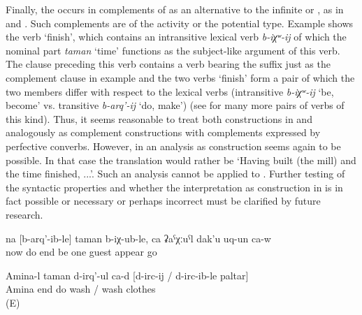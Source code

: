 Finally, the  occurs in complements of  as an alternative to the infinite or , as in  and . Such complements are of the activity or the potential type. Example  shows the verb `finish', which contains an intransitive lexical verb \textit{b-iχʷ-ij} of which the nominal part \textit{taman} `time' functions as the subject-like argument of this verb. The clause preceding this verb contains a verb bearing the  suffix just as the complement clause in example  and the two verbs `finish' form a pair of which the two members differ with respect to the lexical verbs (intransitive \textit{b-iχʷ-ij} `be, become' vs. transitive \textit{b-arq'-ij} `do, make') (see  for many more pairs of verbs of this kind). Thus, it seems reasonable to treat both constructions in  and  analogously as complement constructions with complements expressed by perfective converbs. However, in   an analysis as  construction seems again to be possible. In that case the translation would rather be `Having built (the mill) and the time finished, ...'. Such an analysis cannot be applied to . Further testing of the syntactic properties and whether the interpretation as  construction in  is in fact possible or necessary or perhaps incorrect must be clarified by future research.
%
\begin{exe}

	\ex	\label{ex:‎When they finished building, a man appeared}
	\gll	na	[b-arq'-ib-le]	taman	b-iχ-ub-le,	ca	ʡaˁχːuˁl	dak'u	uq-un	ca-w\\
		now	do	end	be	one	guest	appear	go	\\
	\glt	{}
	
	\ex	\label{ex:Aminat finished to wash / washing the clothes}
	\gll	Amina-l taman d-irq'-ul ca-d	 [d-irc-ij	/	d-irc-ib-le	paltar]\\
		Amina	end	do	 wash	/  wash clothes\\
	\glt	{} (E)
\end{exe}


